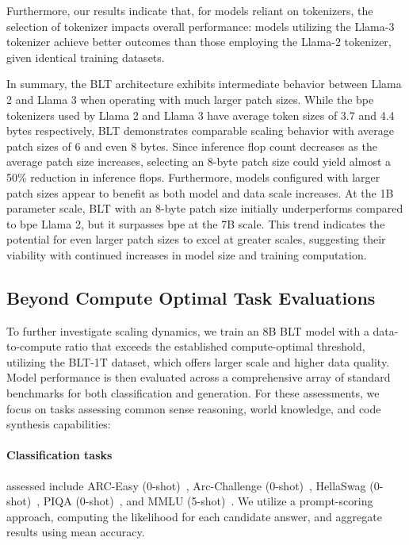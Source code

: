 Furthermore, our results indicate that, for models reliant on tokenizers, the selection of tokenizer impacts overall performance: models utilizing the Llama-3 tokenizer achieve better outcomes than those employing the Llama-2 tokenizer, given identical training datasets.

In summary, the {\textsc BLT} architecture exhibits intermediate behavior between Llama 2 and Llama 3 when operating with much larger patch sizes. While the bpe tokenizers used by Llama 2 and Llama 3 have average token sizes of 3.7 and 4.4 bytes respectively, {\textsc BLT} demonstrates comparable scaling behavior with average patch sizes of 6 and even 8 bytes. Since inference flop count decreases as the average patch size increases, selecting an 8-byte patch size could yield almost a 50\% reduction in inference flops. Furthermore, models configured with larger patch sizes appear to benefit as both model and data scale increases. At the 1B parameter scale, {\textsc BLT} with an 8-byte patch size initially underperforms compared to bpe Llama 2, but it surpasses bpe at the 7B scale. This trend indicates the potential for even larger patch sizes to excel at greater scales, suggesting their viability with continued increases in model size and training computation.

\subsection{Beyond Compute Optimal Task Evaluations}
\label{section:evals}
To further investigate scaling dynamics, we train an 8B {\textsc BLT} model with a data-to-compute ratio that exceeds the established compute-optimal threshold, utilizing the {\textsc BLT}-1T dataset, which offers larger scale and higher data quality. Model performance is then evaluated across a comprehensive array of standard benchmarks for both classification and generation. For these assessments, we focus on tasks assessing common sense reasoning, world knowledge, and code synthesis capabilities:
\paragraph{Classification tasks} assessed include ARC-Easy (0-shot)~\citep{Eval_ARC}, Arc-Challenge (0-shot)~\citep{Eval_ARC}, HellaSwag (0-shot)~\citep{Eval_hellaswag}, PIQA (0-shot)~\citep{Eval_piqa}, and MMLU (5-shot)~\citep{hendrycks2020measuring}. We utilize a prompt-scoring approach, computing the likelihood for each candidate answer, and aggregate results using mean accuracy.
